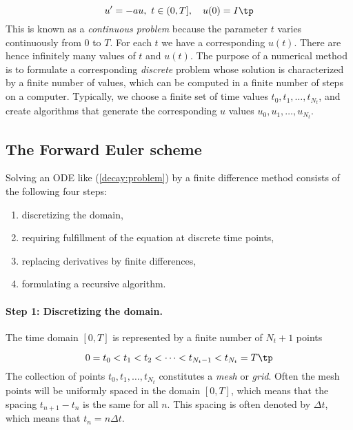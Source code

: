 \documentclass[graybox,sectrefs,envcountresetchap,open=right,final]{svmonodo}
\begin{document}
\begin{equation}
u^{\prime} = -au,\ t\in (0,T], \quad u(0)=I\tp   \label{decay:problem}
\end{equation}
This is known as a \emph{continuous problem} because the parameter $t$
varies continuously from $0$ to $T$. For each $t$ we have a corresponding
$u(t)$. There are hence infinitely many values of $t$ and $u(t)$.
The purpose of a numerical method is to formulate a corresponding
\emph{discrete} problem whose solution is characterized by a finite number of values,
which can be computed in a finite number of steps on a computer.
Typically, we choose a finite set of time values $t_0,t_1,\ldots,t_{N_t}$,
and create algorithms that generate the corresponding $u$ values
$u_0,u_1,\ldots,u_{N_t}$.


\subsection{The Forward Euler scheme}
\label{decay:schemes:FE}

Solving an ODE like (\ref{decay:problem}) by a finite difference method
consists of the following four steps:

\begin{enumerate}
\item discretizing the domain,

\item requiring fulfillment of the equation at discrete time points,

\item replacing derivatives by finite differences,

\item formulating a recursive algorithm.
\end{enumerate}

\noindent
{} 

\paragraph{Step 1: Discretizing the domain.}
The time domain $[0,T]$ is represented by a finite number of
$N_t+1$ points

\begin{equation}
0 = t_0 < t_1 < t_2 < \cdots < t_{N_t-1} < t_{N_t} = T\tp
\end{equation}
The collection of points $t_0,t_1,\ldots,t_{N_t}$ constitutes a \emph{mesh}
or \emph{grid}. Often the mesh points will be uniformly spaced in
the domain $[0,T]$, which means that the spacing $t_{n+1}-t_n$ is
the same for all $n$. This spacing is often denoted by $\Delta t$,
which means that $t_n=n\Delta t$.
\end{document}
